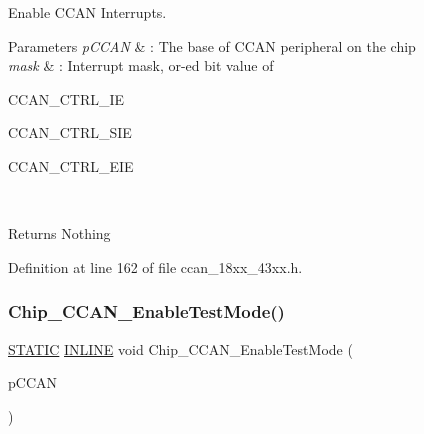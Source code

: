 Enable C\+C\+AN Interrupts. 


\begin{DoxyParams}{Parameters}
{\em p\+C\+C\+AN} & \+: The base of C\+C\+AN peripheral on the chip \\
\hline
{\em mask} & \+: Interrupt mask, or-\/ed bit value of
\begin{DoxyItemize}
\item C\+C\+A\+N\+\_\+\+C\+T\+R\+L\+\_\+\+IE ~\newline

\item C\+C\+A\+N\+\_\+\+C\+T\+R\+L\+\_\+\+S\+IE ~\newline

\item C\+C\+A\+N\+\_\+\+C\+T\+R\+L\+\_\+\+E\+IE ~\newline
 
\end{DoxyItemize}\\
\hline
\end{DoxyParams}
\begin{DoxyReturn}{Returns}
Nothing 
\end{DoxyReturn}


Definition at line 162 of file ccan\+\_\+18xx\+\_\+43xx.\+h.

\mbox{\label{group___c_c_a_n__18_x_x__43_x_x_ga8fdfcf8865fca9748ae26a391842e720}} 
\subsubsection{\texorpdfstring{Chip\+\_\+\+C\+C\+A\+N\+\_\+\+Enable\+Test\+Mode()}{Chip\_CCAN\_EnableTestMode()}}
{\footnotesize\ttfamily \hyperlink{group___l_p_c___types___public___macros_ga10b2d890d871e1489bb02b7e70d9bdfb}{S\+T\+A\+T\+IC} \hyperlink{spifi__18xx__43xx_8h_a2eb6f9e0395b47b8d5e3eeae4fe0c116}{I\+N\+L\+I\+NE} void Chip\+\_\+\+C\+C\+A\+N\+\_\+\+Enable\+Test\+Mode (\begin{DoxyParamCaption}\item[{\hyperlink{struct_l_p_c___c_c_a_n___t}{L\+P\+C\+\_\+\+C\+C\+A\+N\+\_\+T} $\ast$}]{p\+C\+C\+AN }\end{DoxyParamCaption})}



